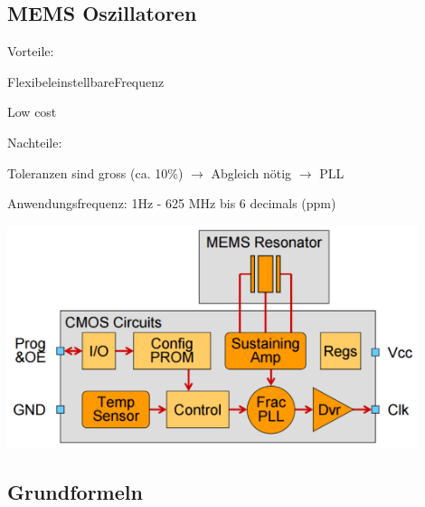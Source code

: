 \subsection{MEMS Oszillatoren}
	\begin{minipage}{0.4\textwidth}
      \begin{compactitem}
        \item Vorteile:
        \begin{compactitem}
          \item FlexibeleinstellbareFrequenz
          \item Low cost
        \end{compactitem}
        \item Nachteile:
        \begin{compactitem}
          \item Toleranzen sind gross (ca. 10\%) $\rightarrow$ Abgleich nötig $\rightarrow$ PLL 
        \end{compactitem}
         \item Anwendungsfrequenz: 1Hz - 625 MHz bis 6 decimals (ppm)
      \end{compactitem}
    \end{minipage}
    \hfill
    \begin{minipage}{0.5\textwidth}
       \vspace{0pt}
       \includegraphics[width=0.9\textwidth]{images/MEMS_Oszillator}   
    \end{minipage}


\subsection{Grundformeln}
\label{subsec:Grundformeln}
